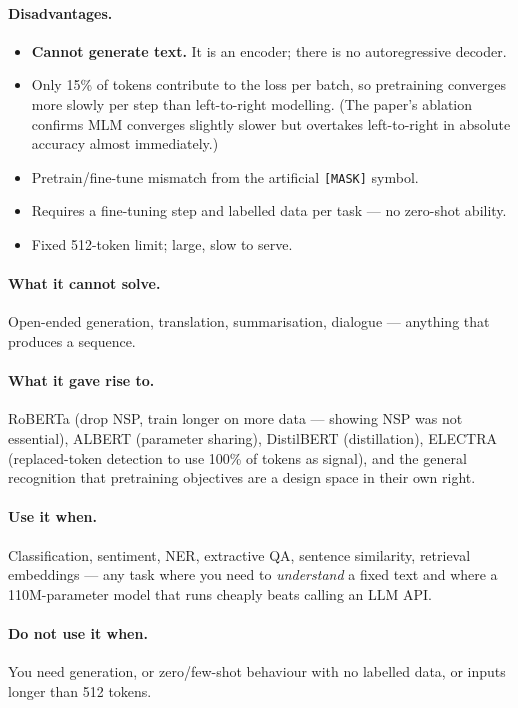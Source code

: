 \documentclass[11pt,a4paper]{article}
\begin{document}
\paragraph{Disadvantages.}
\begin{itemize}
\item \textbf{Cannot generate text.} It is an encoder; there is no autoregressive decoder.
\item Only 15\% of tokens contribute to the loss per batch, so pretraining converges more
  slowly per step than left-to-right modelling. (The paper's ablation confirms MLM converges
  slightly slower but overtakes left-to-right in absolute accuracy almost immediately.)
\item Pretrain/fine-tune mismatch from the artificial \texttt{[MASK]} symbol.
\item Requires a fine-tuning step and labelled data per task --- no zero-shot ability.
\item Fixed 512-token limit; large, slow to serve.
\end{itemize}

\paragraph{What it cannot solve.} Open-ended generation, translation, summarisation, dialogue
--- anything that produces a sequence.

\paragraph{What it gave rise to.} RoBERTa (drop NSP, train longer on more data --- showing
NSP was not essential), ALBERT (parameter sharing), DistilBERT (distillation), ELECTRA
(replaced-token detection to use 100\% of tokens as signal), and the general recognition
that pretraining objectives are a design space in their own right.

\paragraph{Use it when.} Classification, sentiment, NER, extractive QA, sentence similarity,
retrieval embeddings --- any task where you need to \emph{understand} a fixed text and where
a 110M-parameter model that runs cheaply beats calling an LLM API.

\paragraph{Do not use it when.} You need generation, or zero/few-shot behaviour with no
labelled data, or inputs longer than 512 tokens.
\end{document}
